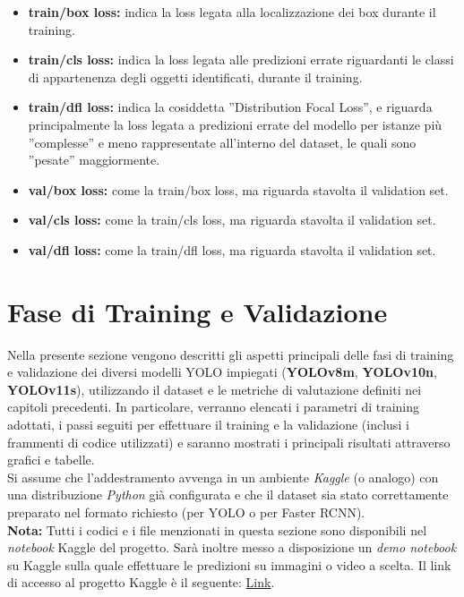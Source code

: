 \documentclass[12pt]{article}
\begin{document}
\begin{itemize}
    \item \textbf{train/box loss:} indica la loss legata alla localizzazione dei box durante il training.
    \item \textbf{train/cls loss:} indica la loss legata alle predizioni errate riguardanti le classi di appartenenza degli oggetti identificati, durante il training.
    \item \textbf{train/dfl loss:} indica la cosiddetta ”Distribution Focal Loss”, e riguarda principalmente la loss legata a predizioni errate del modello per istanze più ”complesse” e meno rappresentate all’interno del dataset, le quali sono ”pesate” maggiormente.
    \item \textbf{val/box loss:} come la train/box loss, ma riguarda stavolta il validation set.
    \item \textbf{val/cls loss:} come la train/cls loss, ma riguarda stavolta il validation set.
    \item \textbf{val/dfl loss:} come la train/dfl loss, ma riguarda stavolta il validation set.
\end{itemize}


\section{Fase di Training e Validazione}

Nella presente sezione vengono descritti gli aspetti principali delle fasi di training e validazione dei diversi modelli YOLO impiegati (\textbf{YOLOv8m}, \textbf{YOLOv10n}, \textbf{YOLOv11s}), utilizzando il dataset e le metriche di valutazione definiti nei capitoli precedenti. In particolare, verranno elencati i parametri di training adottati, i passi seguiti per effettuare il training e la validazione (inclusi i frammenti di codice utilizzati) e saranno mostrati i principali risultati attraverso grafici e tabelle.\\
Si assume che l’addestramento avvenga in un ambiente \textit{Kaggle} (o analogo) con una distribuzione \textit{Python} già configurata e che il dataset sia stato correttamente preparato nel formato richiesto (per YOLO o per Faster RCNN).\\
\textbf{Nota:} Tutti i codici e i file menzionati in questa sezione sono disponibili nel \textit{notebook} Kaggle del progetto. Sarà inoltre messo a disposizione un \textit{demo notebook} su Kaggle sulla quale effettuare le predizioni su immagini o video a scelta. Il link di accesso al progetto Kaggle è il seguente: \href{https://www.kaggle.com/code/denisecilia/training-for-ml-project}{Link}.
\end{document}
